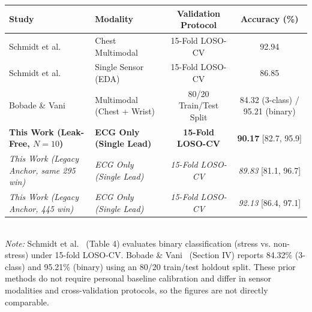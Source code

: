 \begin{tabular}{llcc}
\toprule
\textbf{Study} & \textbf{Modality} & \textbf{Validation Protocol} & \textbf{Accuracy (\%)} \\
\midrule
Schmidt et al.~\cite{schmidt2018introducing} & Chest Multimodal & 15-Fold LOSO-CV & 92.94 \\
Schmidt et al.~\cite{schmidt2018introducing} & Single Sensor (EDA) & 15-Fold LOSO-CV & 86.85 \\
Bobade \& Vani~\cite{bobade2020stress} & Multimodal (Chest + Wrist) & 80/20 Train/Test Split & 84.32 (3-class) / 95.21 (binary) \\
\midrule
\textbf{This Work (Leak-Free, $N=10$)} & \textbf{ECG Only (Single Lead)} & \textbf{15-Fold LOSO-CV} & \textbf{90.17} [82.7, 95.9] \\
\textit{This Work (Legacy Anchor, same 295 win)} & \textit{ECG Only (Single Lead)} & \textit{15-Fold LOSO-CV} & \textit{89.83} [81.1, 96.7] \\
\textit{This Work (Legacy Anchor, 445 win)} & \textit{ECG Only (Single Lead)} & \textit{15-Fold LOSO-CV} & \textit{92.13} [86.4, 97.1] \\
\bottomrule
\end{tabular}\\
{\footnotesize \textit{Note:} Schmidt et al.~\cite{schmidt2018introducing} (Table 4) evaluates binary classification (stress vs. non-stress) under 15-fold LOSO-CV. Bobade \& Vani~\cite{bobade2020stress} (Section IV) reports 84.32\% (3-class) and 95.21\% (binary) using an 80/20 train/test holdout split. These prior methods do not require personal baseline calibration and differ in sensor modalities and cross-validation protocols, so the figures are not directly comparable.}
